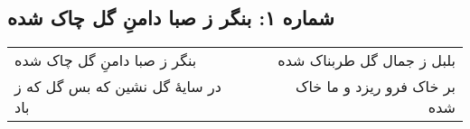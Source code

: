 \begin{center}
\section*{شماره ۱: بنگر ز صبا دامنِ گل چاک شده}
\label{sec:001}
\begin{longtable}{l p{0.5cm} r}
بنگر ز صبا دامنِ گل چاک شده
&&
بلبل ز جمال گل طربناک شده
\\
در سایهٔ گل نشین که بس گل که ز باد
&&
بر خاک فرو ریزد و ما خاک شده
\\
\end{longtable}
\end{center}
